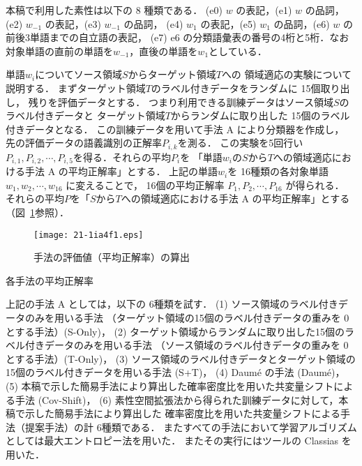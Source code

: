 \documentclass[japanese]{jnlp_1.4}
\begin{document}
本稿で利用した素性は以下の 8 種類である．
(e0) \( w \) の表記，(e1) \( w \) の品詞，(e2) \( w_{-1} \) の表記，(e3) \( w_{-1} \) の品詞，
(e4) \( w_1 \) の表記，(e5) \( w_1 \) の品詞，(e6) \( w \) の前後3単語までの自立語の表記，
(e7) e6 の分類語彙表の番号の4桁と5桁．なお対象単語の直前の単語を\( w_{-1}\)，直後の単語を\( w_1 \)としている．


単語\( w_i \)についてソース領域\( S \)からターゲット領域\( T \)への
領域適応の実験について説明する．
まずターゲット領域\( T \)のラベル付きデータをランダムに 15個取り出し，
残りを評価データとする．
つまり利用できる訓練データはソース領域\( S \)のラベル付きデータと
ターゲット領域\( T \)からランダムに取り出した 15個のラベル付きデータとなる．
この訓練データを用いて手法 A により分類器を作成し，
先の評価データの語義識別の正解率\( P_{i,k} \)を測る．
この実験を5回行い\(P_{i,1},P_{i,2},\cdots,P_{i,5}\)を得る．それらの平均\( P_i \)を
「単語\( w_i \)の\( S \)から\( T \)への領域適応における手法 A の平均正解率」とする．
上記の単語\( w_i \)を 16種類の各対象単語 \(w_1,w_2,\cdots,w_{16}\) に変えることで，
16個の平均正解率 \(P_1,P_2,\cdots,P_{16}\) が得られる．
それらの平均\( P \)を「\( S \)から\( T \)への領域適応における手法 A の平均正解率」とする
（\mbox{図~\ref{zu1}}参照）．

\begin{figure}[b]
\begin{center}
\texttt{[image: 21-1ia4f1.eps]}
\end{center}
\caption{手法の評価値（平均正解率）の算出}
\label{zu1}
\end{figure} 
\begin{table}[b]
\caption{各手法の平均正解率}
\label{tab:resultall}

\end{table}



上記の手法 A としては，以下の 6種類を試す．
(1) ソース領域のラベル付きデータのみを用いる手法
（ターゲット領域の15個のラベル付きデータの重みを 0 とする手法）(S-Only)，
(2) ターゲット領域からランダムに取り出した15個のラベル付きデータのみを用いる手法
（ソース領域のラベル付きデータの重みを 0 とする手法）(T-Only)，
(3) ソース領域のラベル付きデータとターゲット領域の15個のラベル付きデータを用いる手法 (S+T)，
(4) Daum{\'e} の手法 (Daum{\'e})，
(5) 本稿で示した簡易手法により算出した確率密度比を用いた共変量シフトによる手法 (Cov-Shift)，
(6) 素性空間拡張法から得られた訓練データに対して，本稿で示した簡易手法により算出した
確率密度比を用いた共変量シフトによる手法（提案手法）の計 6種類である．
またすべての手法において学習アルゴリズムとしては最大エントロピー法を用いた．
またその実行にはツールの Classias を用いた\cite{Classias}．
\end{document}
